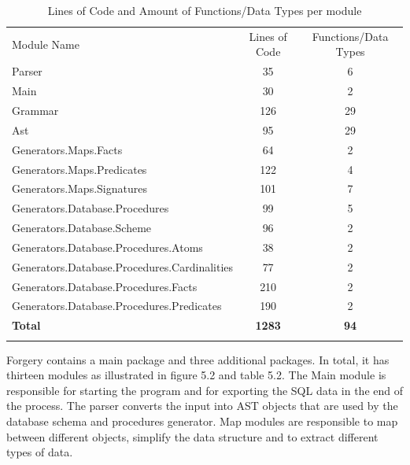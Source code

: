 \documentclass[oneside]{book}
\renewcommand\arraystretch{1.3}
\begin{document}
\def\arraystretch{1.5}%
\begin{table}[h!]
  \label{tab:table1}
  \begin{tabular}{|l||c|c|}
  \hhline{-|-|-|}
    Module Name & Lines of Code & Functions/Data Types \\
    \hhline{|=|=|=|}
    Parser & 35 & 6 \\
    \hhline{-|-|-|}
    Main & 30 & 2 \\
    \hhline{-|-|-|}
    Grammar & 126 & 29 \\
    \hhline{-|-|-|}
    Ast & 95 & 29 \\
    \hhline{-|-|-|}
    Generators.Maps.Facts & 64 & 2 \\
    \hhline{-|-|-|}
    Generators.Maps.Predicates & 122 & 4 \\
    \hhline{-|-|-|}
    Generators.Maps.Signatures & 101 & 7 \\
    \hhline{-|-|-|}
    Generators.Database.Procedures & 99 & 5 \\
    \hhline{-|-|-|}
    Generators.Database.Scheme & 96 & 2 \\
    \hhline{-|-|-|}
    Generators.Database.Procedures.Atoms & 38 & 2 \\
    \hhline{-|-|-|}
    Generators.Database.Procedures.Cardinalities & 77 & 2 \\
    \hhline{-|-|-|}
    Generators.Database.Procedures.Facts & 210 & 2 \\
    \hhline{-|-|-|}
    Generators.Database.Procedures.Predicates & 190 & 2 \\
     \hhline{-|-|-|}
    \textbf{Total} & \textbf{1283} & \textbf{94} \\
    \hhline{-|-|-|}
  \end{tabular}
  \centering
  \caption{Lines of Code and Amount of Functions/Data Types per module}
\end{table}

\newpage

Forgery contains a main package and three additional packages. In total, it has thirteen modules as illustrated in figure 5.2 and table 5.2. The Main module is responsible for starting the program and for exporting the SQL data in the end of the process. The parser converts the input into AST objects that are used by the database schema and procedures generator. Map modules are responsible to map between different objects, simplify the data structure and to extract different types of data.
\end{document}
